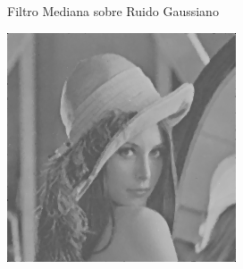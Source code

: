 \documentclass{beamer}
\begin{document}
\begin{frame}[fragile]{Filtro Mediana sobre Ruido Gaussiano}
\begin{minipage}{0.25\linewidth}
	\end{minipage}\hfill
	\begin{minipage}{0.25\linewidth}
		\centering
		\includegraphics[width=\linewidth]{../results/lena_gauss_sigma50_mediana}
	\end{minipage}
\end{frame}
\end{document}
